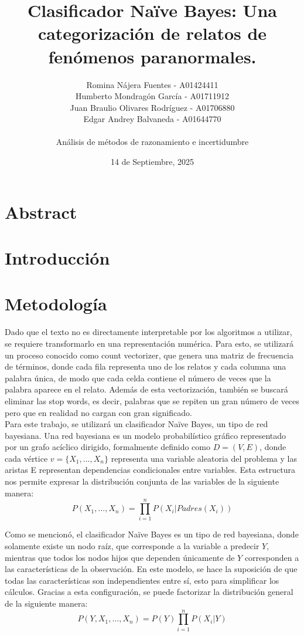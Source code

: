 \documentclass[12pt, letterpaper]{report}
\title{Clasificador Naïve Bayes: Una categorización de relatos de fenómenos paranormales.}
\author{ Romina Nájera Fuentes - A01424411 \\ Humberto Mondragón García - A01711912 \\ Juan Braulio Olivares Rodríguez - A01706880 \\ Edgar Andrey Balvaneda - A01644770
 \\ \\ Análisis de métodos de razonamiento e incertidumbre}
\date{14 de Septiembre, 2025}
\begin{document}
\maketitle
\section*{Abstract}

\section*{Introducción}

\section*{Metodología}

Dado que el texto no es directamente interpretable por los algoritmos a utilizar, se requiere transformarlo en una representación numérica. Para esto, se utilizará un proceso conocido como count vectorizer, que genera una matriz de frecuencia de términos, donde cada fila representa uno de los relatos y cada columna una palabra única, de modo que cada celda contiene el número de veces que la palabra aparece en el relato. Además de esta vectorización, también se buscará eliminar las stop words, es decir, palabras que se repiten un gran número de veces pero que en realidad no cargan con gran significado.
\\

Para este trabajo, se utilizará un clasificador Naïve Bayes, un tipo de red bayesiana. Una red bayesiana es un modelo probabilístico gráfico representado por un grafo acíclico dirigido, formalmente definido como $D=(V, E)$, donde cada vértice $v=\{ X_1, ..., X_n\}$ representa una variable aleatoria del problema y las aristas E representan dependencias condicionales entre variables. Esta estructura nos permite expresar la distribución conjunta de las variables de la siguiente manera:
\begin{equation*}
    P(X_1,\ldots ,X_n)=\prod_{i=1}^n P(X_i|Padres(X_i))
\end{equation*}

Como se mencionó, el clasificador Naïve Bayes es un tipo de red bayesiana, donde solamente existe un nodo raíz, que corresponde a la variable a predecir $Y$, mientras que todos los nodos hijos que dependen únicamente de $Y$ corresponden a las características de la observación. En este modelo, se hace la suposición de que todas las características son independientes entre sí, esto para simplificar los cálculos. Gracias a esta configuración, se puede factorizar la distribución general de la siguiente manera:
\begin{equation*}
    P(Y,X_1,\ldots ,X_n)=P(Y)\prod_{i=1}^n P(X_i|Y)
\end{equation*}
\end{document}
